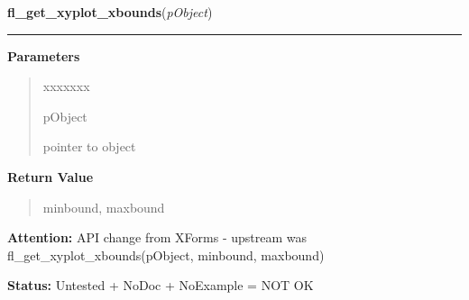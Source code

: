     \label{xformslib:library:fl_get_xyplot_xbounds}

    \vspace{0.5ex}

\hspace{.8\funcindent}\begin{boxedminipage}{\funcwidth}

    \raggedright \textbf{fl\_get\_xyplot\_xbounds}(\textit{pObject})

    \vspace{-1.5ex}

    \rule{\textwidth}{0.5\fboxrule}
\setlength{\parskip}{2ex}
\setlength{\parskip}{1ex}
      \textbf{Parameters}
      \vspace{-1ex}

      \begin{quote}
        \begin{Ventry}{xxxxxxx}

          \item[pObject]

          pointer to object

        \end{Ventry}

      \end{quote}

      \textbf{Return Value}
    \vspace{-1ex}

      \begin{quote}
      minbound, maxbound

      \end{quote}

\textbf{Attention:} API change from XForms - upstream was fl\_get\_xyplot\_xbounds(pObject, 
minbound, maxbound)



\textbf{Status:} Untested + NoDoc + NoExample = NOT OK



    \end{boxedminipage}

    \label{xformslib:library:fl_get_xyplot_ybounds}

    \vspace{0.5ex}

